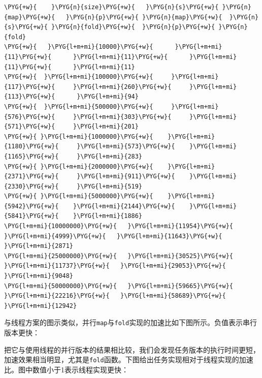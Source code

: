 \begin{codeblockbg}
\begin{Verbatim}[commandchars=\\\{\},breaklines=true,breakanywhere=true,fontsize=\codefont,xleftmargin=17bp]
\PYG{+w}{    }\PYG{n}{size}\PYG{+w}{   }\PYG{n}{s}\PYG{+w}{ }\PYG{n}{map}\PYG{+w}{   }\PYG{n}{p}\PYG{+w}{ }\PYG{n}{map}\PYG{+w}{  }\PYG{n}{s}\PYG{+w}{ }\PYG{n}{fold}\PYG{+w}{  }\PYG{n}{p}\PYG{+w}{ }\PYG{n}{fold}
\PYG{+w}{   }\PYG{l+m+mi}{10000}\PYG{+w}{      }\PYG{l+m+mi}{11}\PYG{+w}{      }\PYG{l+m+mi}{11}\PYG{+w}{      }\PYG{l+m+mi}{11}\PYG{+w}{      }\PYG{l+m+mi}{11}
\PYG{+w}{  }\PYG{l+m+mi}{100000}\PYG{+w}{     }\PYG{l+m+mi}{117}\PYG{+w}{     }\PYG{l+m+mi}{260}\PYG{+w}{     }\PYG{l+m+mi}{113}\PYG{+w}{      }\PYG{l+m+mi}{94}
\PYG{+w}{  }\PYG{l+m+mi}{500000}\PYG{+w}{     }\PYG{l+m+mi}{576}\PYG{+w}{     }\PYG{l+m+mi}{303}\PYG{+w}{     }\PYG{l+m+mi}{571}\PYG{+w}{     }\PYG{l+m+mi}{201}
\PYG{+w}{ }\PYG{l+m+mi}{1000000}\PYG{+w}{    }\PYG{l+m+mi}{1180}\PYG{+w}{     }\PYG{l+m+mi}{573}\PYG{+w}{    }\PYG{l+m+mi}{1165}\PYG{+w}{     }\PYG{l+m+mi}{283}
\PYG{+w}{ }\PYG{l+m+mi}{2000000}\PYG{+w}{    }\PYG{l+m+mi}{2371}\PYG{+w}{     }\PYG{l+m+mi}{911}\PYG{+w}{    }\PYG{l+m+mi}{2330}\PYG{+w}{     }\PYG{l+m+mi}{519}
\PYG{+w}{ }\PYG{l+m+mi}{5000000}\PYG{+w}{    }\PYG{l+m+mi}{5942}\PYG{+w}{    }\PYG{l+m+mi}{2144}\PYG{+w}{    }\PYG{l+m+mi}{5841}\PYG{+w}{    }\PYG{l+m+mi}{1886}
\PYG{l+m+mi}{10000000}\PYG{+w}{   }\PYG{l+m+mi}{11954}\PYG{+w}{    }\PYG{l+m+mi}{4999}\PYG{+w}{   }\PYG{l+m+mi}{11643}\PYG{+w}{    }\PYG{l+m+mi}{2871}
\PYG{l+m+mi}{25000000}\PYG{+w}{   }\PYG{l+m+mi}{30525}\PYG{+w}{   }\PYG{l+m+mi}{11737}\PYG{+w}{   }\PYG{l+m+mi}{29053}\PYG{+w}{    }\PYG{l+m+mi}{9048}
\PYG{l+m+mi}{50000000}\PYG{+w}{   }\PYG{l+m+mi}{59665}\PYG{+w}{   }\PYG{l+m+mi}{22216}\PYG{+w}{   }\PYG{l+m+mi}{58689}\PYG{+w}{   }\PYG{l+m+mi}{12942}
\end{Verbatim}
\end{codeblockbg}



与线程方案的图示类似，并行\texttt{map}与\texttt{fold}实现的加速比如下图所示。负值表示串行版本更快：





把它与使用线程的并行版本的结果相比较，我们会发现任务版本的执行时间更短，加速效果相当明显，尤其是\texttt{fold}函数。下图给出任务实现相对于线程实现的加速比。图中数值小于1表示线程实现更快：


